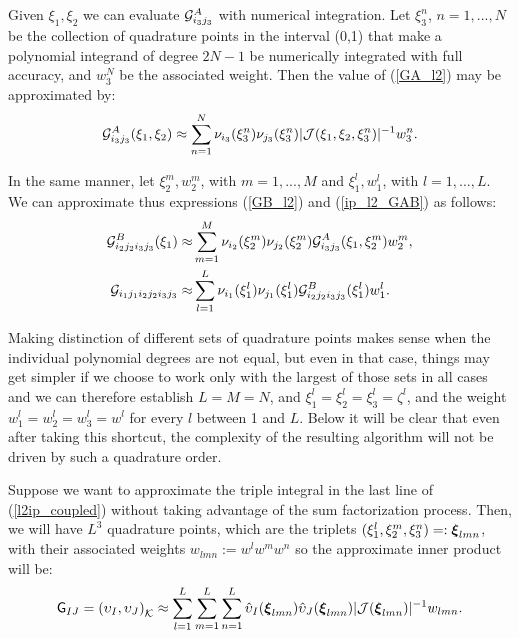 Given $\xi_1,\xi_2$ we can evaluate $\mathcal{G}_{i_3j_3}^A$ with numerical integration. Let $\xi_3^n$, $n=1,...,N$ be the collection of quadrature points in the interval (0,1) that make a polynomial integrand of degree $2N-1$ be numerically integrated with full accuracy, and $w_3^N$ be the associated weight. Then the value of (\ref{GA_l2}) may be approximated by:
% 
\begin{equation}
    \mathcal{G}_{i_3j_3}^A(\xi_1,\xi_2)\approx \sum\limits_{n=1}^N\nu_{i_3}(\xi_3^n)\nu_{j_3}(\xi_3^n)|\mathcal{J}(\xi_1,\xi_2,\xi_3^n)|^{-1}w_3^n.
    \label{GA_l2_quad}
\end{equation}

In the same manner, let $\xi_2^m,w_2^m$, with $m=1,...,M$ and $\xi^l_1,w_1^l$, with $l=1,...,L$. We can approximate thus expressions (\ref{GB_l2}) and (\ref{ip_l2_GAB}) as follows:
% 
\begin{align}
    \mathcal{G}_{i_2j_2i_3j_3}^B(\xi_1)\approx& \sum\limits_{m=1}^M\nu_{i_2}(\xi_2^m)\nu_{j_2}(\xi_2^m)\mathcal{G}_{i_3j_3}^A(\xi_1,\xi_2^m)w_2^m, \label{GB_l2_quad}\\
    \mathcal{G}_{i_1j_1i_2j_2i_3j_3}\approx&
    \sum\limits_{l=1}^L\nu_{i_1}(\xi_1^l)\nu_{j_1}(\xi_1^l)\mathcal{G}_{i_2j_2i_3j_3}^B(\xi_1^l)w_1^l .\label{ip_l2tensor}    
\end{align}

Making distinction of different sets of quadrature points makes sense when the individual polynomial degrees are not equal, but even in that case, things may get simpler if we choose to work only with the largest of those sets in all cases and we can therefore establish $L=M=N$, and $\xi_1^l=\xi_2^l=\xi_3^l=\zeta^l$, and the weight $w_1^l=w_2^l=w_3^l=w^l$ for every $l$ between 1 and $L$. Below it will be clear that even after taking this shortcut, the complexity of the resulting algorithm will not be driven by such a quadrature order.

Suppose we want to approximate the triple integral in the last line of (\ref{l2ip_coupled}) without taking advantage of the sum factorization process. Then, we will have $L^3$ quadrature points, which are the triplets $(\xi_1^l,\xi_2^m,\xi_3^n)=:\boldsymbol{\xi}_{lmn}$, with their associated weights $w_{lmn}:=w^lw^mw^n$ so the approximate inner product will be:
% 
\begin{equation}
    \mathsf{G}_{IJ}=\left(\upsilon_I,\upsilon_J\right)_{\mathcal{K}}\approx \sum\limits_{l=1}^L\sum\limits_{m=1}^L\sum\limits_{n=1}^L \hat{\upsilon}_I(\boldsymbol{\xi}_{lmn})\hat{\upsilon}_J(\boldsymbol{\xi}_{lmn})|\mathcal{J}(\boldsymbol{\xi}_{lmn})|^{-1}w_{lmn}.
    \label{ip_l2conven}
\end{equation}

